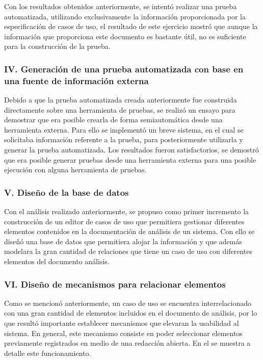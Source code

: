 	Con los resultados obtenidos anteriormente, se intentó realizar una prueba automatizada, utilizando exclusivamente la información proporcionada por la especificación de casos de uso, el resultado de este ejercicio mostró que aunque la información que proporciona este documento es bastante útil, no es suficiente para la construcción de la prueba.
		
\subsubsection{IV. Generación de una prueba automatizada con base en una fuente de información externa}
	
	Debido a que la prueba automatizada creada anteriormente fue construida directamente sobre una herramienta de pruebas, se realizó un ensayo para demostrar que era posible crearla de forma semiautomática desde una herramienta externa. Para ello se implementó un breve sistema, en el cual se solicitaba información referente a la prueba, para posteriormente utilizarla y generar la prueba automatizada. Los resultados fueron satisfactorios, se demostró que era posible generar pruebas desde una herramienta externa para una posible ejecución con alguna herramienta de pruebas.
		
\subsubsection{V. Diseño de la base de datos}

	Con el análisis realizado anteriormente, se propuso como primer incremento la construcción de un editor de casos de uso que permitiera gestionar diferentes elementos contenidos en la documentación de análisis de un sistema. Con ello se diseñó una base de datos que permitiera alojar la información y que además modelara la gran cantidad de relaciones que tiene un caso de uso con diferentes elementos del documento análisis.
			
\subsubsection{VI. Diseño de mecanismos para relacionar elementos}

	Como se mencionó anteriormente, un caso de uso se encuentra interrelacionado con una gran cantidad de elementos incluidos en el documento de análisis, por lo que resultó importante establecer mecanismos que elevaran la usabilidad al sistema. En general, este mecanismo consiste en poder seleccionar elementos previamente registrados en medio de una redacción abierta. En el  se muestra a detalle este funcionamiento.

	 